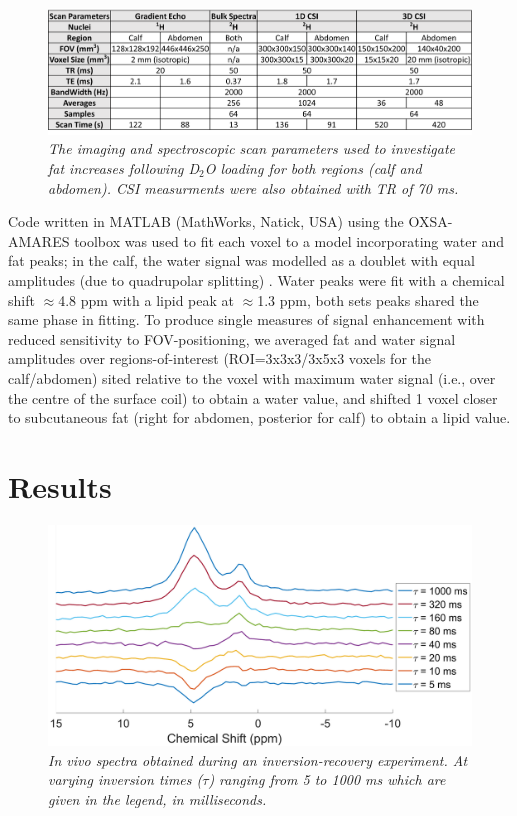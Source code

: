 \documentclass[class=article, crop=false]{standalone}
\begin{document}
\begin{figure}
    \centering
    \includegraphics[width=1\textwidth]{Figures/Lipid/Scan_Details.png}
    \caption{\textit{The imaging and spectroscopic scan parameters used to investigate fat increases following D$_2$O loading for both regions (calf and abdomen). CSI measurments were also obtained with TR of 70 ms.}}
    \label{fig:Lip:Scan_Detail}
\end{figure}

Code written in MATLAB (MathWorks, Natick, USA) using the OXSA-AMARES \cite{Purvis2017OXSA:MATLAB} toolbox was used to fit each voxel to a model incorporating water and fat peaks; in the calf, the water signal was modelled as a doublet with equal amplitudes (due to quadrupolar splitting) \cite{Gursan2022ResidualMuscle}. Water peaks were fit with a chemical shift $\approx$4.8 ppm with a lipid peak at $\approx$1.3 ppm, both sets peaks shared the same phase in fitting. To produce single measures of signal enhancement with reduced sensitivity to FOV-positioning, we averaged fat and water signal amplitudes over regions-of-interest (ROI=3x3x3/3x5x3 voxels for the calf/abdomen) sited relative to the voxel with maximum water signal (i.e., over the centre of the surface coil) to obtain a water value, and shifted 1 voxel closer to subcutaneous fat (right for abdomen, posterior for calf) to obtain a lipid value.

\section{Results}

\begin{figure}
    \centering
    \includegraphics[width=1\textwidth]{Figures/Lipid/NA_IR.png}
    \caption{\textit{\textit{In vivo} spectra obtained during an inversion-recovery experiment. At varying inversion times ($\tau$) ranging from 5 to 1000 ms which are given in the legend, in milliseconds.}}
    \label{fig:Lip:IR}
\end{figure}
\end{document}
